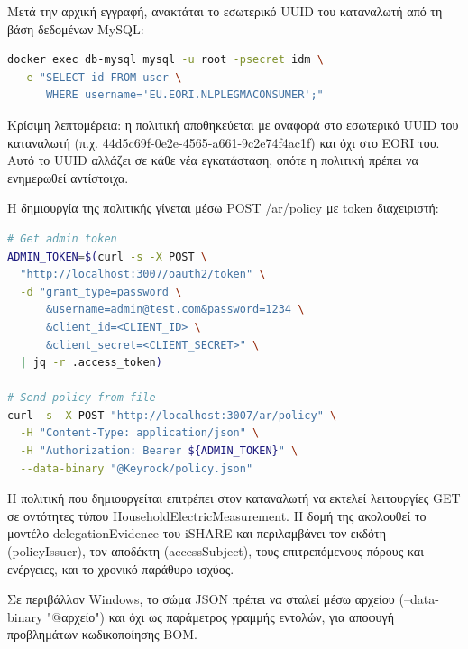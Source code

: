 Μετά την αρχική εγγραφή, ανακτάται το εσωτερικό \textlatin{UUID}
του καταναλωτή από τη βάση δεδομένων \textlatin{MySQL}:

\begin{lstlisting}[language=bash, caption={Retrieving consumer UUID from MySQL.}, stringstyle=\color{black}, keywordstyle=\color{black}]
docker exec db-mysql mysql -u root -psecret idm \
  -e "SELECT id FROM user \
      WHERE username='EU.EORI.NLPLEGMACONSUMER';"
\end{lstlisting}
\selectlanguage{greek}

Κρίσιμη λεπτομέρεια: η πολιτική αποθηκεύεται με αναφορά στο
εσωτερικό \textlatin{UUID} του καταναλωτή (π.χ.
\textlatin{44d5c69f-0e2e-4565-a661-9c2e74f4ac1f}) και όχι στο
\textlatin{EORI} του. Αυτό το \textlatin{UUID} αλλάζει σε κάθε
νέα εγκατάσταση, οπότε η πολιτική πρέπει να ενημερωθεί αντίστοιχα.

Η δημιουργία της πολιτικής γίνεται μέσω \textlatin{POST /ar/policy}
με \textlatin{token} διαχειριστή:

\begin{lstlisting}[language=bash, caption={Creating the delegation policy.}, stringstyle=\color{black}, keywordstyle=\color{black}]
# Get admin token
ADMIN_TOKEN=$(curl -s -X POST \
  "http://localhost:3007/oauth2/token" \
  -d "grant_type=password \
      &username=admin@test.com&password=1234 \
      &client_id=<CLIENT_ID> \
      &client_secret=<CLIENT_SECRET>" \
  | jq -r .access_token)

# Send policy from file
curl -s -X POST "http://localhost:3007/ar/policy" \
  -H "Content-Type: application/json" \
  -H "Authorization: Bearer ${ADMIN_TOKEN}" \
  --data-binary "@Keyrock/policy.json"
\end{lstlisting}
\selectlanguage{greek}

Η πολιτική που δημιουργείται επιτρέπει στον καταναλωτή να εκτελεί
λειτουργίες \textlatin{GET} σε οντότητες τύπου
\textlatin{HouseholdElectricMeasurement}. Η δομή της ακολουθεί
το μοντέλο \textlatin{delegationEvidence} του \textlatin{iSHARE}
και περιλαμβάνει τον εκδότη (\textlatin{policyIssuer}), τον αποδέκτη
(\textlatin{accessSubject}), τους επιτρεπόμενους πόρους και ενέργειες,
και το χρονικό παράθυρο ισχύος.

Σε περιβάλλον \textlatin{Windows}, το σώμα \textlatin{JSON} πρέπει
να σταλεί μέσω αρχείου (\textlatin{--data-binary "@αρχείο"}) και όχι
ως παράμετρος γραμμής εντολών, για αποφυγή προβλημάτων
κωδικοποίησης \textlatin{BOM}.

